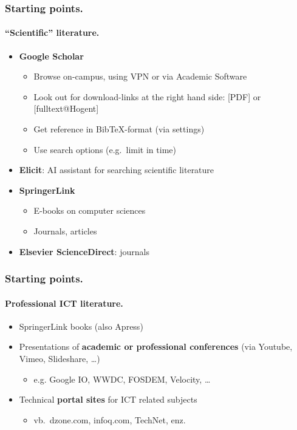 \documentclass[aspectratio=169]{beamer}
\begin{document}
\begin{frame}
    \frametitle{Starting points.}
    \framesubtitle{``Scientific'' literature.}

    \begin{itemize}
        \item<+-> \textbf{Google Scholar}
            \begin{itemize}
                \item Browse on-campus, using VPN or via Academic Software
                \item Look out for download-links at the right hand side: [PDF] or [fulltext@Hogent]
                \item Get reference in Bib{\TeX}-format (via settings)
                \item Use search options (e.g.~limit in time)
            \end{itemize}
        \item<+-> \textbf{Elicit}: AI assistant for searching scientific literature
        \item<+-> \textbf{SpringerLink}
            \begin{itemize}
                \item E-books on computer sciences
                \item Journals, articles
            \end{itemize}
        \item<+-> \textbf{Elsevier ScienceDirect}: journals
    \end{itemize}
\end{frame}

\begin{frame}
    \frametitle{Starting points.}
    \framesubtitle{Professional ICT literature.}

    \begin{itemize}
        \item SpringerLink books (also Apress)
        \item Presentations of \textbf{academic or professional conferences} (via Youtube, Vimeo, Slideshare, \dots)
              \begin{itemize}
                  \item e.g. Google IO, WWDC, FOSDEM, Velocity, \dots
              \end{itemize}
        \item<+-> Technical \textbf{portal sites} for ICT related subjects
            \begin{itemize}
                \item vb.~dzone.com, infoq.com, TechNet, enz.
            \end{itemize}
    \end{itemize}
\end{frame}
\end{document}

